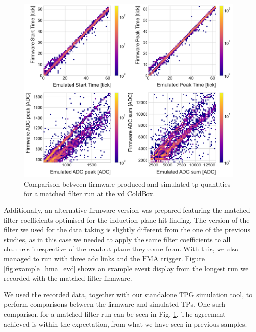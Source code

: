 \begin{figure}[t]
    \centering
    \includegraphics[scale = 0.5]{Images/Matched_Filter/np02_coldbox_tp_comp.pdf}
    \caption[Comparison between firmware-produced and simulated \gls{tp} quantities for a matched filter run at the \gls{vd} ColdBox.]{Comparison between firmware-produced and simulated \gls{tp} quantities for a matched filter run at the \gls{vd} ColdBox.}
    \label{fig:vdcoldbox_tp_comp}
\end{figure}

Additionally, an alternative firmware version was prepared featuring the matched filter coefficients optimised for the induction plane hit finding. The version of the filter we used for the data taking is slightly different from the one of the previous studies, as in this case we needed to apply the same filter coefficients to all channels irrespective of the readout plane they come from. With this, we also managed to run with three \gls{adc} links and the HMA trigger. Figure \ref{fig:example_hma_evd} shows an example event display from the longest run we recorded with the matched filter firmware.

We used the recorded data, together with our standalone TPG simulation tool, to perform comparisons between the firmware and simulated TPs. One such comparison for a matched filter run can be seen in Fig. \ref{fig:vdcoldbox_tp_comp}. The agreement achieved is within the expectation, from what we have seen in previous samples.

